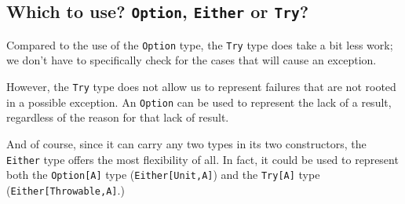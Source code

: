 \documentclass[11pt]{article}
\begin{document}
\subsection{Which to use? \texttt{Option}, \texttt{Either} or \texttt{Try}?}
\label{sec:orgfe5a597}
Compared to the use of the \texttt{Option} type,
the \texttt{Try} type does take a bit less work;
we don't have to specifically check for the cases that
will cause an exception.

However, the \texttt{Try} type does not allow us to represent failures
that are not rooted in a possible exception.
An \texttt{Option} can be used to represent the lack of a result,
regardless of the reason for that lack of result.

And of course, since it can carry any two types in its two constructors,
the \texttt{Either} type offers the most flexibility of all.
In fact, it could be used to represent both the \texttt{Option[A]} type
(\texttt{Either[Unit,A]}) and the \texttt{Try[A]} type (\texttt{Either[Throwable,A]}.)
\end{document}
